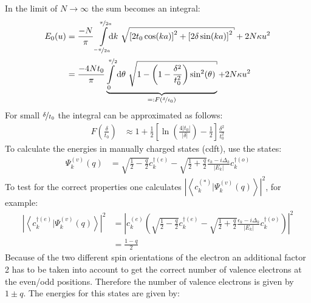 In the limit of $N \rightarrow \infty$ the sum becomes an integral:
\begin{align}
	E_0(u) &= \frac{-N}{\pi}\int\limits_{\nicefrac{-\pi}{2a}}^{\nicefrac{\pi}{2a}}\hspace*{-0.2cm}\text{d}k\ \sqrt{\left[2t_0\cos(ka)\right]^2+\left[2\delta\sin(ka)\right]^2} + 2N\kappa u^2\\
	&=\frac{-4Nt_0}{\pi}\underbrace{\int\limits_{0}^{\nicefrac{\pi}{2}}\text{d}\theta\ \sqrt{1-\left(1-\frac{\delta^2}{t_0^2}\right)\sin^2(\theta)}}_{=:F(\nicefrac{\delta}{t_0})} + 2N\kappa u^2
\end{align}
For small $\nicefrac{\delta}{t_0}$ the integral can be approximated as follows:
\begin{align}
	F\left(\frac{\delta}{t_0}\right) &\approx 1 + \frac{1}{2} \left[\ln\left(\frac{4|t_0|}{|\delta|}\right)-\frac{1}{2}\right]\frac{\delta^2}{t_0^2} 
\end{align}
To calculate the energies in manually charged states (cdft), use the states:
\begin{align}
		\Psi_k^{(v)}(q) &= \sqrt{\frac{1}{2}-\frac{q}{2}}c_k^{\dagger(e)}- \sqrt{\frac{1}{2}+\frac{q}{2}}\frac{\epsilon_k - i \Delta_k}{|E_k|}c_{k}^{\dagger(o)}
\end{align}
To test for the correct properties one calculates $\left|\left\langle c^{(*)}_k|\Psi_k^{(v)}(q)\right\rangle\right|^2$, for example:
\begin{align}
	\left|\left\langle c^{\dagger(e)}_k|\Psi_k^{(v)}(q)\right\rangle\right|^2 &= \left|c_k^{(e)} \left(\sqrt{\frac{1}{2}-\frac{q}{2}}c_k^{\dagger(e)}- \sqrt{\frac{1}{2}+\frac{q}{2}}\frac{\epsilon_k - i \Delta_k}{|E_k|}c_{k}^{\dagger(o)}\right)\right|^2\\
	&= \frac{1-q}{2}
\end{align}
Because of the two different spin orientations of the electron an additional factor 2 has to be taken into account to get the correct number of valence electrons at the even/odd positions. Therefore the number of valence electrons is given by $1 \pm q$. The energies for this states are given by:
